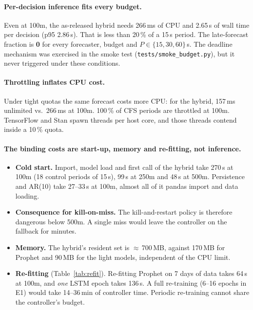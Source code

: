 \documentclass[11pt,a4paper]{article}
\begin{document}
\paragraph{Per-decision inference fits every budget.} Even at 100m, the as-released hybrid needs
266\,ms of CPU and 2.65\,s of wall time per decision (p95 2.86\,s). That is less than 20\,\% of a 15\,s period.
The late-forecast fraction is \textbf{0} for every forecaster, budget and $P\in\{15,30,60\}$\,s. The deadline
mechanism was exercised in the smoke test (\texttt{tests/smoke\_budget.py}), but it never triggered under these
conditions.

\paragraph{Throttling inflates CPU cost.} Under tight quotas the same forecast costs more CPU: for the hybrid,
157\,ms unlimited vs.\ 266\,ms at 100m. 100\,\% of CFS periods are throttled at 100m. TensorFlow and Stan spawn
threads per host core, and those threads contend inside a 10\,\% quota.

\paragraph{The binding costs are start-up, memory and re-fitting, not inference.}
\begin{itemize}
\item \textbf{Cold start.} Import, model load and first call of the hybrid take 270\,s at 100m (18 control
      periods of 15\,s), 99\,s at 250m and 48\,s at 500m. Persistence and AR(10) take 27--33\,s at 100m, almost
      all of it pandas import and data loading.
\item \textbf{Consequence for kill-on-miss.} The kill-and-restart policy is therefore dangerous below 500m. A
      single miss would leave the controller on the fallback for minutes.
\item \textbf{Memory.} The hybrid's resident set is $\approx$\,700\,MB, against 170\,MB for Prophet and
      90\,MB for the light models, independent of the CPU limit.
\item \textbf{Re-fitting} (Table~\ref{tab:refit}). Re-fitting Prophet on 7 days of data takes 64\,s at 100m,
      and \emph{one} LSTM epoch takes 136\,s. A full re-training (6--16 epochs in E1) would take 14--36\,min of
      controller time. Periodic re-training cannot share the controller's budget.
\end{itemize}
\end{document}
